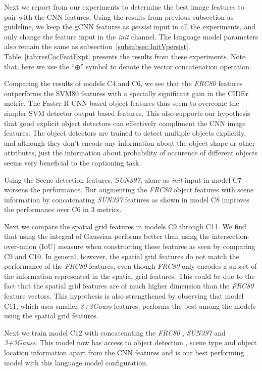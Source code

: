 Next we report from our experiments to determine the best image features to pair
with the CNN features.
Using the results from previous subsection as guideline, we keep the gCNN
features as \emph{persist} input in all the experiments, and only change the
feature input in the \emph{init} channel.
The language model parameters also remain the same as
subsection~\ref{subsubsec:InitVpersist}.
Table~\ref{tab:resCocFeatExpt} presents the results from these experiments.
Note that, here we use the ``$\oplus$'' symbol to denote the vector
concatenation operation.

Comparing the results of models C4 and C6, we see that the \emph{FRC80} features
outperforms the SVM80 features with a specially significant gain in the CIDEr
metric.
The Faster R-CNN based object features thus seem to overcome the simpler SVM
detector output based features.
This also supports our hypothesis that good explicit object detectors can
effectively compliment the CNN image features. 
The object detectors are trained to detect multiple objects explicitly, and
although they don't encode any information about the object shape or other
attributes, just the information about probability of occurence of different
objects seems very beneficial to the captioning task.

Using the Scene detection features, \emph{SUN397}, alone as \emph{init} input in
model C7 worsens the performance.
But augmenting the \emph{FRC80} object features with scene information by
concatenating \emph{SUN397} features as shown in model C8 improves the
performance over C6 in 3 metrics.

Next we compare the spatial grid features in models C9 through C11.
We find that using the integral of Gaussian performs better than using the
intersection-over-union (IoU) measure when constructing these features as seen
by comparing C9 and C10. 
In general, however, the spatial grid features do not match the performance of
the \emph{FRC80} features, even though \emph{FRC80} only encodes a subset of the
information represented in the spatial grid features.
This could be due to the fact that the spatial grid features are of much higher
dimension than the \emph{FRC80} feature vectors.
This hypothesis is also strengthened by observing that model C11, which uses
smaller \emph{3+3Gauss} features, performs the best among the models using the
spatial grid features.

Next we train model C12 with concatenating the \emph{FRC80} , \emph{SUN397}  and
\emph{3+3Gauss}. 
This model now has access to object detection , scene type and object location
information apart from the CNN features and is our best performing model with
this language model configuration.

